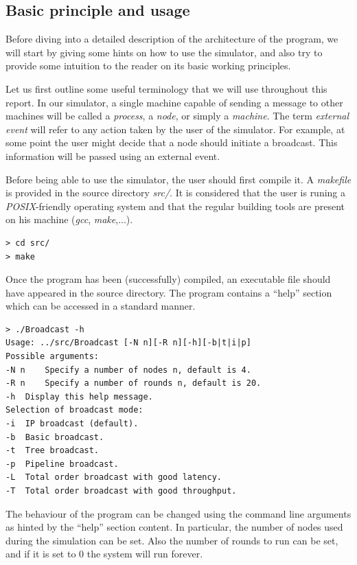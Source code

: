 \documentclass[a4paper]{article}
\begin{document}
\subsection{Basic principle and usage}
Before diving into a detailed description of the architecture of the program,
we will start by giving some hints on how to use the simulator, and also try
to provide some intuition to the reader on its basic working principles.

Let us first outline some useful terminology that we will use throughout this
report. In our simulator, a single machine capable of sending a message to
other machines will be called a \textit{process}, a \textit{node}, or simply
a \textit{machine}. The term \textit{external event} will refer to any action
taken by the user of the simulator. For example, at some point the user might
decide that a node should initiate a broadcast. This information will be
passed using an external event.

Before being able to use the simulator, the user should first compile it. A
\textit{makefile} is provided in the source directory \textit{src/}. It is
considered that the user is runing a \textit{POSIX}-friendly operating system
and that the regular building tools are present on his machine (\textit{gcc},
\textit{make},...).
\begin{lstlisting}
> cd src/
> make
\end{lstlisting}

Once the program has been (successfully) compiled, an executable file should
have appeared in the source directory. The program contains a ``help'' section
which can be accessed in a standard manner.
\begin{lstlisting}
> ./Broadcast -h
Usage: ../src/Broadcast [-N n][-R n][-h][-b|t|i|p]
Possible arguments:
-N n	Specify a number of nodes n, default is 4.
-R n	Specify a number of rounds n, default is 20.
-h	Display this help message.
Selection of broadcast mode:
-i	IP broadcast (default).
-b	Basic broadcast.
-t	Tree broadcast.
-p	Pipeline broadcast.
-L	Total order broadcast with good latency.
-T	Total order broadcast with good throughput.
\end{lstlisting}

The behaviour of the program can be changed using the command line arguments
as hinted by the ``help'' section content. In particular, the number of nodes
used during the simulation can be set. Also the number of rounds to run can be
set, and if it is set to $0$ the system will run forever.
\end{document}
